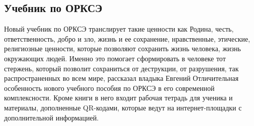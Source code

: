 \large
\subsection{Учебник по ОРКСЭ}

Новый учебник по ОРКСЭ транслирует такие ценности как Родина, честь, ответственность, добро и зло, жизнь и ее сохранение, нравственные, этические, религиозные ценности, которые позволяют сохранить жизнь человека, жизнь окружающих людей. Именно это помогает сформировать в человеке тот стержень, который позволит сохраниться от деструкции, от разрушения, так распространенных во всем мире, рассказал владыка Евгений \cite{pravobraz} Отличительная особенность нового учебного пособия по ОРКСЭ в его современной комплексности. Кроме книги в него входит рабочая тетрадь для ученика и материалы, дополненные QR-кодами, которые ведут на интернет-площадки с дополнительной информацией.